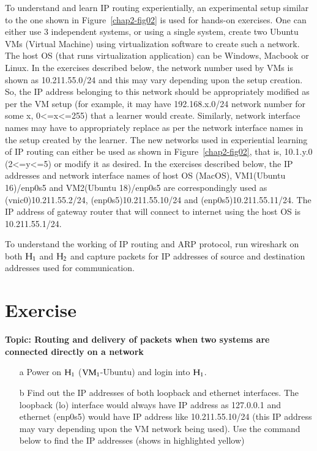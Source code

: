 \begin{multicols}{2}
To understand and learn IP routing experientially, an experimental setup similar to the one shown in Figure~\ref{chap2-fig02} is used for hands-on exercises. One can either use 3 independent systems, or using a single system, create two Ubuntu VMs (Virtual Machine) using virtualization software \cite{art2-key07}\cite{art2-key08}\cite{art2-key09} to create such a network. The host OS (that runs virtualization application) can be Windows, Macbook or Linux. In the exercises described below, the network number used by VMs is shown as 10.211.55.0/24 and this may vary depending upon the setup creation. So, the IP address belonging to this network should be appropriately modified as per the VM setup (for example, it may have 192.168.x.0/24 network number for some x, 0<=x<=255) that a learner would create. Similarly, network interface names may have to appropriately replace as per the network interface names in the setup created by the learner. The new networks used in experiential learning of IP routing can either be used as shown in Figure~\ref{chap2-fig02}, that is, 10.1.y.0 (2<=y<=5) or modify it as desired. In the exercises described below, the IP addresses and network interface names of host OS (MacOS), VM1(Ubuntu 16)/enp0s5 and VM2(Ubuntu 18)/enp0s5 are correspondingly used as (vnic0)10.211.55.2/24, (enp0s5)10.211.55.10/24 and (enp0s5)10.211.55.11/24. The IP address of gateway router that will connect to internet using the host OS is 10.211.55.1/24.

To understand the working of IP routing and ARP protocol, run wireshark on both ${\rm H}_{1}$ and ${\rm H}_{2}$ and capture packets for IP addresses of source and destination addresses used for communication.

\setcounter{section}{0}
\section*{Exercise \label{chap2-exe1}}

\textbf{Topic: Routing and delivery of packets when two systems are connected directly on a network}

\vspace{-.5cm}

\begin{itemize}
\item[a] Power on ${\rm H}_{1}$ (${\rm VM}_{1}$-Ubuntu) and login into ${\rm H}_{1}$.
\item[b] Find out the IP addresses of both loopback and ethernet interfaces. The loopback (lo) interface would always have IP address as 127.0.0.1 and ethernet (enp0s5) would have IP address like 10.211.55.10/24 (this IP address may vary depending upon the VM network being used). Use the command below to find the IP addresses (shows in highlighted yellow)


\end{itemize}
\end{multicols}
